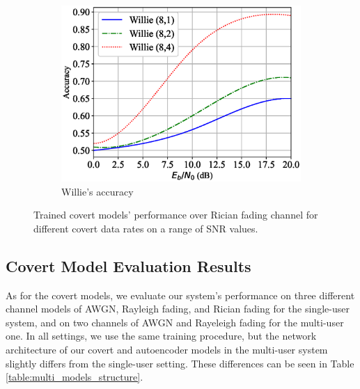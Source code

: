 \begin{figure}[tp!]
\begin{subfigure}{0.28\textwidth}
		\includegraphics[width=\linewidth]{figs/willie_accuracy_rician}
		\caption{Willie's accuracy}
		\label{fig:rician_resutls_willie}
	\end{subfigure}
	\caption{Trained covert models' performance over Rician fading channel for different covert data rates on a range of SNR values.}
	\label{fig:rician_resutls}
\end{figure}


\subsection{Covert Model Evaluation Results}
As for the covert models, we evaluate our system's performance on three different channel models of AWGN, Rayleigh fading, and Rician fading for the single-user system, and on two channels of AWGN and Rayeleigh fading for the multi-user one. In all settings, we use the same training procedure, but the network architecture of our covert and autoencoder models in the multi-user system slightly differs from the single-user setting. These differences can be seen in Table \ref{table:multi_models_structure}.

